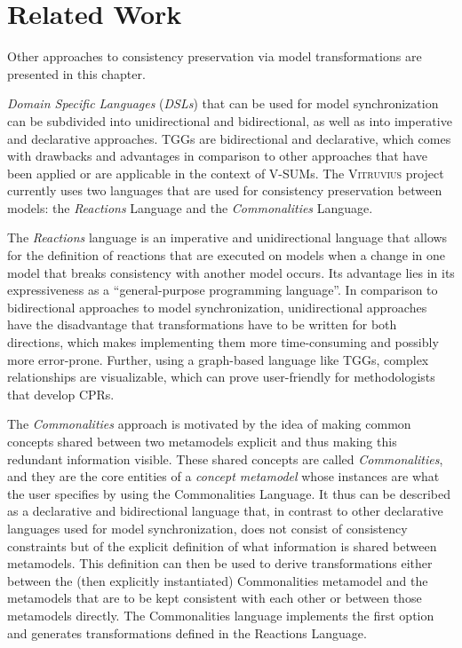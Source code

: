 \chapter{Related Work}
\label{ch:RelatedWork}
Other approaches to consistency preservation via model transformations are presented in this chapter.

\emph{Domain Specific Languages} (\emph{DSLs}) that can be used for model synchronization can be subdivided into unidirectional and bidirectional, as well as into imperative and declarative approaches.
TGGs are bidirectional and declarative, which comes with drawbacks and advantages in comparison to other approaches
that have been applied or are applicable in the context of V-SUMs.
The \textsc{Vitruvius} project currently uses two languages that are used for consistency preservation between models: the \emph{Reactions} Language and the \emph{Commonalities} Language.

The \emph{Reactions} language \cite{kramer_specification_2017} is an imperative and unidirectional language that allows for the definition of reactions that are executed on models when a change in one model that breaks consistency with another model occurs. Its advantage lies in its expressiveness as a \enquote{general-purpose programming language}\cite{kramer_specification_2017}.
In comparison to bidirectional approaches to model synchronization, unidirectional approaches have the disadvantage that transformations have to be written for both directions, which makes implementing them more time-consuming and possibly more error-prone. Further, using a graph-based language like TGGs, complex relationships are visualizable, which can prove user-friendly for methodologists that develop CPRs.

The \emph{Commonalities} approach \cite{klare_commonalities_2019}
is motivated by the idea of making common concepts shared between two metamodels explicit and thus making this redundant information visible.
These shared concepts are called \emph{Commonalities}, and they are the core entities of a \emph{concept metamodel} whose instances are what the user specifies by using the Commonalities Language.
It thus can be described as a declarative and bidirectional language that, in contrast to other declarative languages used for model synchronization, does not consist of consistency constraints but of the explicit definition of what information is shared between metamodels. This definition can then be used to derive transformations either between the (then explicitly instantiated) Commonalities metamodel and the metamodels that are to be kept consistent with each other 
or between those metamodels directly. The Commonalities language implements the first option and generates transformations defined in the Reactions Language.

